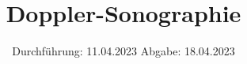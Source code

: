 



\subject{US3}
\title{Doppler-Sonographie}
\date{%
  Durchführung: 11.04.2023
  \hspace{3em}
  Abgabe: 18.04.2023
}


\setlength{\parindent}{0pt} %

\maketitle
\thispagestyle{empty}
\tableofcontents
\newpage







\printbibliography{}




